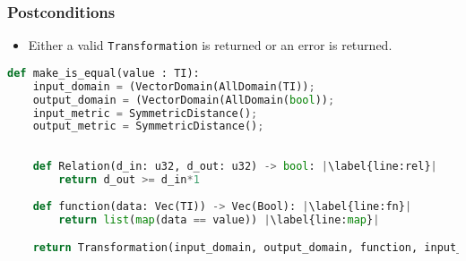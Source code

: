 \subsubsection*{Postconditions}

\begin{itemize}
    \item Either a valid \texttt{Transformation} is returned or an error is returned.
\end{itemize}

\begin{lstlisting}[language=Python, escapechar=|]
def make_is_equal(value : TI):
    input_domain = (VectorDomain(AllDomain(TI));
    output_domain = (VectorDomain(AllDomain(bool));
    input_metric = SymmetricDistance(); 
    output_metric = SymmetricDistance();
    
    
    def Relation(d_in: u32, d_out: u32) -> bool: |\label{line:rel}|
        return d_out >= d_in*1
        
    def function(data: Vec(TI)) -> Vec(Bool): |\label{line:fn}|
        return list(map(data == value)) |\label{line:map}|

    return Transformation(input_domain, output_domain, function, input_metric, output_metric, Relation)
\end{lstlisting}


